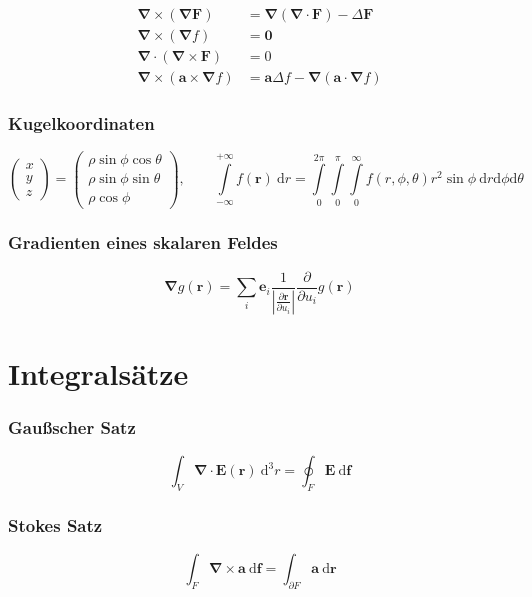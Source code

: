 \documentclass[titlepage,11pt,a4paper,ngerman]{report}
\newcommand{\prt}[2]{\frac{\partial #1}{\partial #2}}
\renewcommand{\vec}[1]{\boldsymbol{#1}}
\newcommand{\vabla}{\boldsymbol{\nabla}}
\renewcommand{\paragraph}[1]{\subsubsection{#1}}
\begin{document}
\begin{align*}
	\vec{\nabla}\times(\vec{\nabla}\vec{F})&=\vec{\nabla}(\vec{\nabla}\cdot\vec{F})-\Delta\vec{F}\\
	\vec{\nabla}\times(\vec{\nabla}f)&=\vec{0}\\
	\vec{\nabla}\cdot(\vec{\nabla}\times\vec{F})&=0\\
	\vec{\nabla}\times(\vec{a}\times\vec{\nabla}f)&=\vec{a}\Delta f-\vec{\nabla}(\vec{a}\cdot\vec{\nabla}f)
\end{align*}

\paragraph{Kugelkoordinaten}

$$
\begin{pmatrix}
	x \\ y\\ z
\end{pmatrix}
=
\begin{pmatrix}
	\rho \sin \phi \cos \theta\\
	\rho \sin \phi \sin \theta\\
	\rho \cos \phi
\end{pmatrix}
, \qquad \int\limits_{-\infty}^{+\infty} f(\vec{r})\ \textrm{d}r = \int\limits_{0}^{2 \pi} \int\limits_{0}^{\pi} \int\limits_{0}^{\infty} f(r,\phi,\theta) r^2 \sin \phi\ \textrm{d}r \textrm{d}\phi \textrm{d}\theta
$$

\paragraph{Gradienten eines skalaren Feldes}

$$\vabla g(\vec{r}) = \sum_i \vec{e}_i \frac{1}{\left|\prt{\vec{r}}{u_i}\right|}\prt{}{u_i}g(\vec{r})$$


\section{Integralsätze}

\paragraph{Gaußscher Satz}
$$\int_{V} \vabla \cdot \vec{E}(\vec{r})\ \mathrm{d}^{3}r = \oint_{F}\vec{E}\ \mathrm{d}\vec{f}$$

\paragraph{Stokes Satz}
$$\int_{F} \vabla \times \vec{a}\ \mathrm{d}\vec{f} = \int_{\partial F}\vec{a}\ \mathrm{d}\vec{r}$$
\end{document}
